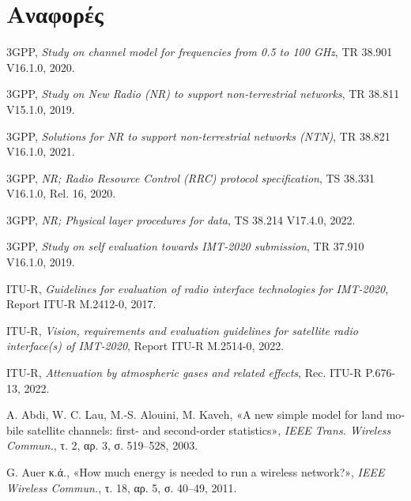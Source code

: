 \documentclass[11pt,a4paper]{article}
\begin{document}
\sloppy
\section*{Αναφορές}

\begin{enumerate}[label={[\arabic*]},leftmargin=2.4em,itemsep=1pt]
\item 3GPP, \textenglish{\emph{Study on channel model for frequencies from 0.5
to 100 GHz}}, TR 38.901 V16.1.0, 2020.
\item 3GPP, \textenglish{\emph{Study on New Radio (NR) to support
non-terrestrial networks}}, TR 38.811 V15.1.0, 2019.
\item 3GPP, \textenglish{\emph{Solutions for NR to support non-terrestrial
networks (NTN)}}, TR 38.821 V16.1.0, 2021.
\item 3GPP, \textenglish{\emph{NR; Radio Resource Control (RRC) protocol
specification}}, TS 38.331 V16.1.0, Rel. 16, 2020.
\item 3GPP, \textenglish{\emph{NR; Physical layer procedures for data}},
TS 38.214 V17.4.0, 2022.
\item 3GPP, \textenglish{\emph{Study on self evaluation towards IMT-2020
submission}}, TR 37.910 V16.1.0, 2019.
\item ITU-R, \textenglish{\emph{Guidelines for evaluation of radio
interface technologies for IMT-2020}}, Report ITU-R M.2412-0, 2017.
\item ITU-R, \textenglish{\emph{Vision, requirements and evaluation guidelines
for satellite radio interface(s) of IMT-2020}}, Report ITU-R M.2514-0, 2022.
\item ITU-R, \textenglish{\emph{Attenuation by atmospheric gases and related
effects}}, Rec. ITU-R P.676-13, 2022.
\item A. Abdi, W. C. Lau, M.-S. Alouini, M. Kaveh, \textenglish{«A new simple
model for land mobile satellite channels: first- and second-order statistics»},
\textenglish{\emph{IEEE Trans. Wireless Commun.}}, τ. 2, αρ. 3, σ. 519–528, 2003.
\item G. Auer κ.ά., \textenglish{«How much energy is needed to run a wireless
network?»}, \textenglish{\emph{IEEE Wireless Commun.}}, τ. 18, αρ. 5,
σ. 40–49, 2011.
\end{enumerate}
\end{document}
